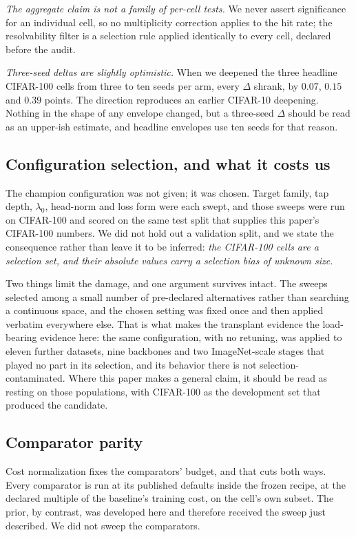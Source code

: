 \emph{The aggregate claim is not a family of per-cell tests.} We never
assert significance for an individual cell, so no multiplicity correction
applies to the hit rate; the resolvability filter is a selection rule
applied identically to every cell, declared before the audit.

\emph{Three-seed deltas are slightly optimistic.} When we deepened the
three headline CIFAR-100 cells from three to ten seeds per arm, every
$\Delta$ shrank, by $0.07$, $0.15$ and $0.39$ points. The direction
reproduces an earlier CIFAR-10 deepening. Nothing in the shape of any
envelope changed, but a three-seed $\Delta$ should be read as an
upper-ish estimate, and headline envelopes use ten seeds for that reason.

\subsection{Configuration selection, and what it costs us}\label{sec:selection}
The champion configuration was not given; it was chosen. Target family,
tap depth, $\lambda_0$, head-norm and loss form were each swept, and those
sweeps were run on CIFAR-100 and scored on the same test split that
supplies this paper's CIFAR-100 numbers. We did not hold out a validation
split, and we state the consequence rather than leave it to be inferred:
\emph{the CIFAR-100 cells are a selection set, and their absolute values
carry a selection bias of unknown size.}

Two things limit the damage, and one argument survives intact. The sweeps
selected among a small number of pre-declared alternatives rather than
searching a continuous space, and the chosen setting was fixed once and
then applied verbatim everywhere else. That is what makes the transplant
evidence the load-bearing evidence here: the same configuration, with no
retuning, was applied to eleven further datasets, nine backbones and two
ImageNet-scale stages that played no part in its selection, and its
behavior there is not selection-contaminated. Where this paper makes a
general claim, it should be read as resting on those populations, with
CIFAR-100 as the development set that produced the candidate.

\subsection{Comparator parity}\label{sec:parity}
Cost normalization fixes the comparators' budget, and that cuts both ways.
Every comparator is run at its published defaults inside the frozen recipe,
at the declared multiple of the baseline's training cost, on the cell's own
subset. The prior, by contrast, was developed here and therefore received
the sweep just described. We did not sweep the comparators.

